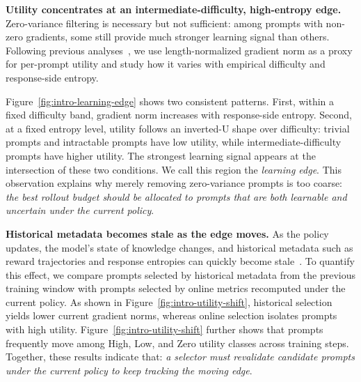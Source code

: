 \textbf{Utility concentrates at an intermediate-difficulty, high-entropy edge.}
Zero-variance filtering is necessary but not sufficient: among prompts with non-zero gradients, some still provide much stronger learning signal than others. Following previous analyses~\cite{kim2025mitigatinglengthbiasrlhf,paul2021DataDiet,fayyaz2022bertdatadietfinding,singhal2024aCOLM}, we use length-normalized gradient norm as a proxy for per-prompt utility and study how it varies with empirical difficulty and response-side entropy.

Figure~\ref{fig:intro-learning-edge} shows two consistent patterns. First, within a fixed difficulty band, gradient norm increases with response-side entropy. Second, at a fixed entropy level, utility follows an inverted-U shape over 
difficulty: trivial prompts and intractable prompts have low utility, while intermediate-difficulty prompts have 
higher utility. The strongest learning signal appears at the intersection of these two conditions. We call this 
region the \textit{learning edge}. This observation explains why merely removing zero-variance prompts is too 
coarse: \textit{the best rollout budget should be allocated to prompts that are both learnable and uncertain under the 
current policy}.

\textbf{Historical metadata becomes stale as the edge moves.}
As the policy updates, the model's state of knowledge changes, and historical 
metadata such as reward trajectories and response entropies can quickly become stale~\cite{cui2025entropymechanismreinforcementlearning,tomihari2026learningdynamicsrlposttraining,li2026stalefeedbackcoevolvingcritics}. 
To quantify this effect, we compare prompts selected by historical metadata from the previous training window 
with prompts selected by online metrics recomputed under the current policy. As shown in Figure~\ref{fig:intro-utility-shift}, 
historical selection yields lower current gradient norms, whereas online selection isolates prompts with high utility. Figure~\ref{fig:intro-utility-shift} further shows that prompts frequently move among High, Low, and Zero utility classes across training steps. Together, these results indicate that: \textit{a selector must revalidate candidate prompts under the current policy to keep tracking the moving edge}.

